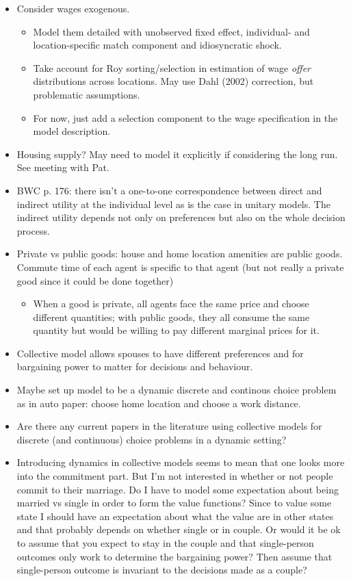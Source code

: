 \begin{itemize}
\begin{itemize}
\end{itemize}
\item Consider wages exogenous. 
\begin{itemize}
\item Model them detailed with unobserved fixed effect, individual- and location-specific match component and idiosyncratic shock.
\item Take account for Roy sorting/selection in estimation of wage \textit{offer} distributions across locations. May use Dahl (2002) correction, but problematic assumptions.
\item For now, just add a selection component to the wage specification in the model description.
\end{itemize}
\item Housing supply? May need to model it explicitly if considering the long run. See meeting with Pat.
\item BWC p. 176: there isn't a one-to-one correspondence between direct and indirect utility at the individual level as is the case in unitary models. The indirect utility depends not only on preferences but also on the whole decision process.
\item Private vs public goods: house and home location amenities are public goods. Commute time of each agent is specific to that agent (but not really a private good since it could be done together)
\begin{itemize}
\item When a good is private, all agents face the same price and choose different quantities; with public goods, they all consume the same quantity but would be willing to pay different marginal prices for it.
\end{itemize}
\item Collective model allows spouses to have different preferences and for bargaining power to matter for decisions and behaviour.
\item Maybe set up model to be a dynamic discrete and continous choice problem as in auto paper: choose home location and choose a work distance. 
\item Are there any current papers in the literature using collective models for discrete (and continuous) choice problems in a dynamic setting?
\item Introducing dynamics in collective models seems to mean that one looks more into the commitment part. But I'm not interested in whether or not people commit to their marriage. Do I have to model some expectation about being married vs single in order to form the value functions? Since to value some state I should have an expectation about what the value are in other states and that probably depends on whether single or in couple. Or would it be ok to assume that you expect to stay in the couple and that single-person outcomes only work to determine the bargaining power? Then assume that single-person outcome is invariant to the decisions made as a couple?

\end{itemize}
